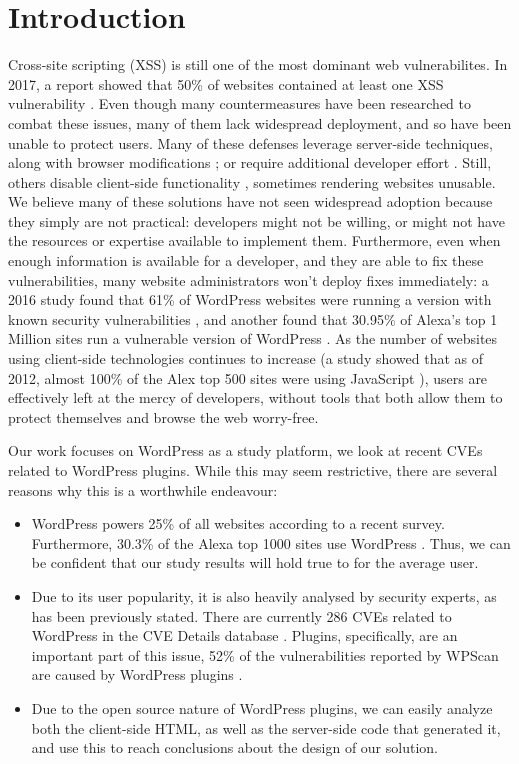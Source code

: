 \section{Introduction}

Cross-site scripting (XSS) is still one of the most dominant web vulnerabilites. In 2017, a report showed that 50\% of websites contained at least one XSS vulnerability \cite{Acunetix}. Even though many countermeasures have been researched to combat these issues, many of them lack widespread deployment, and so have been unable to protect users. Many of these defenses leverage server-side techniques, along with browser modifications \cite{Jim:2007:DSI:1242572.1242654,Nadji:2009}; or require additional developer effort \cite{10.1007/978-3-319-66399-9_7}. Still, others disable client-side functionality \cite{Noscript,Snyder:2017:MWD:3133956.3133966}, sometimes rendering websites unusable. We believe many of these solutions have not seen widespread adoption because they simply are not practical: developers might not be willing, or might not have the resources or expertise available to implement them. Furthermore, even when enough information is available for a developer, and they are able to fix these vulnerabilities, many website administrators won't deploy fixes immediately: a 2016 study found that 61\% of WordPress websites were running a version with known security vulnerabilities \cite{Sucuri}, and another found that 30.95\% of Alexa's top 1 Million sites run a vulnerable version of WordPress \cite{wpwhitesecurity}. As the number of websites using client-side technologies continues to increase (a study showed that as of 2012, almost 100\% of the Alex top 500 sites were using JavaScript \cite{Stock:2017:WTI:3241189.3241265}), users are effectively left at the mercy of developers, without tools that both allow them to protect themselves and browse the web worry-free.

Our work focuses on WordPress as a study platform, we look at recent CVEs related to WordPress plugins. While this may seem restrictive, there are several reasons why this is a worthwhile endeavour:
\begin{itemize}
	\item WordPress powers 25\% of all websites according to a recent survey. Furthermore, 30.3\% of the Alexa top 1000 sites use WordPress \cite{w3techs}. Thus, we can be confident that our study results will hold true to for the average user.
	\item Due to its user popularity, it is also heavily analysed by security experts, as has been previously stated. There are currently 286 CVEs related to WordPress in the CVE Details database \cite{cvedetails}. Plugins, specifically, are an important part of this issue, 52\% of the vulnerabilities reported by WPScan are caused by WordPress plugins \cite{wpscan}.
	\item Due to the open source nature of WordPress plugins, we can easily analyze both the client-side HTML, as well as the server-side code that generated it, and use this to reach conclusions about the design of our solution.
	
\end{itemize}

